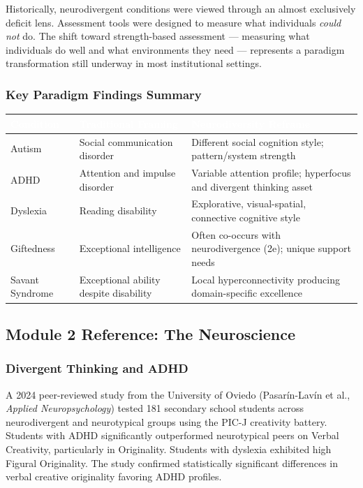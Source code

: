 \documentclass[11pt,letterpaper]{article}
\newcommand{\tableheader}[1]{\textbf{\sffamily\textcolor{white}{#1}}}
\begin{document}
Historically, neurodivergent conditions were viewed through an almost exclusively deficit lens. Assessment tools were designed to measure what individuals \textit{could not} do. The shift toward strength-based assessment --- measuring what individuals do well and what environments they need --- represents a paradigm transformation still underway in most institutional settings.

\subsubsection{Key Paradigm Findings Summary}

\begin{center}
\begin{tabularx}{\textwidth}{L{3cm}L{4cm}X}
\toprule
{}
\tableheader{Condition} & \tableheader{Traditional Framing} & \tableheader{Neurodiversity Reframe} \\
\midrule
Autism & Social communication disorder & Different social cognition style; pattern/system strength \\
ADHD & Attention and impulse disorder & Variable attention profile; hyperfocus and divergent thinking asset \\
Dyslexia & Reading disability & Explorative, visual-spatial, connective cognitive style \\
Giftedness & Exceptional intelligence & Often co-occurs with neurodivergence (2e); unique support needs \\
Savant Syndrome & Exceptional ability despite disability & Local hyperconnectivity producing domain-specific excellence \\
\bottomrule
\end{tabularx}
\end{center}

\subsection{Module 2 Reference: The Neuroscience}

\subsubsection{Divergent Thinking and ADHD}

A 2024 peer-reviewed study from the University of Oviedo (Pasarín-Lavín et al., \textit{Applied Neuropsychology}) tested 181 secondary school students across neurodivergent and neurotypical groups using the PIC-J creativity battery. Students with ADHD significantly outperformed neurotypical peers on Verbal Creativity, particularly in Originality. Students with dyslexia exhibited high Figural Originality. The study confirmed statistically significant differences in verbal creative originality favoring ADHD profiles.
\end{document}
